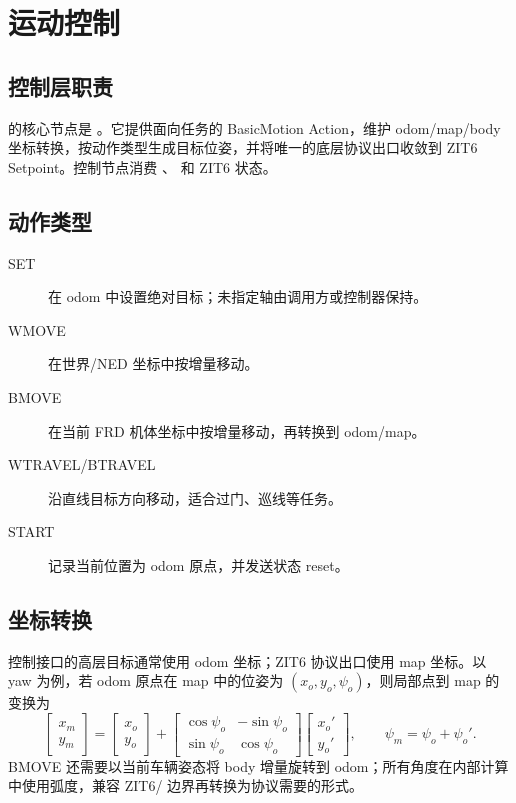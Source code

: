 \chapter{运动控制}
\label{ch:control}

\section{控制层职责}
 的核心节点是 。它提供面向任务的 BasicMotion Action，维护 odom/map/body 坐标转换，按动作类型生成目标位姿，并将唯一的底层协议出口收敛到 ZIT6 Setpoint。控制节点消费 、 和 ZIT6 状态。

\section{动作类型}
\begin{description}
  \item[SET] 在 odom 中设置绝对目标；未指定轴由调用方或控制器保持。
  \item[WMOVE] 在世界/NED 坐标中按增量移动。
  \item[BMOVE] 在当前 FRD 机体坐标中按增量移动，再转换到 odom/map。
  \item[WTRAVEL/BTRAVEL] 沿直线目标方向移动，适合过门、巡线等任务。
  \item[START] 记录当前位置为 odom 原点，并发送状态 reset。
\end{description}

\section{坐标转换}
控制接口的高层目标通常使用 odom 坐标；ZIT6 协议出口使用 map 坐标。以 yaw 为例，若 odom 原点在 map 中的位姿为 $(x_o,y_o,\psi_o)$，则局部点到 map 的变换为
\begin{equation}
  \begin{bmatrix}x_m\\y_m\end{bmatrix}
  = \begin{bmatrix}x_o\\y_o\end{bmatrix}
  + \begin{bmatrix}\cos\psi_o&-\sin\psi_o\\
  \sin\psi_o&\cos\psi_o\end{bmatrix}
  \begin{bmatrix}x_o'\\y_o'\end{bmatrix},
  \qquad \psi_m=\psi_o+\psi_o'.
\end{equation}
BMOVE 还需要以当前车辆姿态将 body 增量旋转到 odom；所有角度在内部计算中使用弧度，兼容 ZIT6/ 边界再转换为协议需要的形式。

